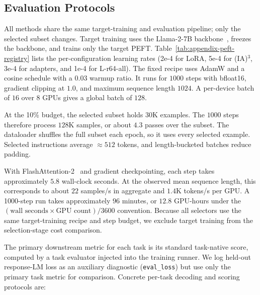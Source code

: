 \subsection{Evaluation Protocols}
\label{sec:appendix-protocols}

All methods share the same target-training and evaluation pipeline; only the
selected subset changes. Target training uses the Llama-2-7B
backbone~\cite{touvron2023llama2}, freezes the backbone, and trains only the
target PEFT. Table~\ref{tab:appendix-peft-registry} lists the per-configuration
learning rates (2e-4 for LoRA, 5e-4 for (IA)$^3$, 3e-4 for adapters, and 1e-4
for L-r64-all). The fixed recipe uses AdamW and a cosine schedule with a $0.03$
warmup ratio. It runs for $1000$ steps with
bfloat16, gradient clipping at $1.0$, and maximum sequence length $1024$. A
per-device batch of $16$ over $8$ GPUs gives a global batch of $128$.

At the 10\% budget, the selected subset holds $30$K examples. The $1000$ steps
therefore process $128$K samples, or about $4.3$ passes over the subset. The
dataloader shuffles the full subset each epoch, so it uses every selected example.
Selected instructions average $\approx512$ tokens, and length-bucketed batches
reduce padding.

With FlashAttention-2~\cite{dao2024flashattention2} and gradient checkpointing,
each step takes approximately $5.8$ wall-clock seconds. At the observed mean
sequence length, this corresponds to about $22$ samples/s in aggregate and
$1.4$K tokens/s per GPU. A 1000-step run takes approximately $96$ minutes, or
$12.8$ GPU-hours under the
$(\text{wall seconds}\times\text{GPU count})/3600$ convention. Because all
selectors use the same target-training recipe and step budget, we exclude
target training from the selection-stage cost comparison.

The primary downstream metric for each task is its standard task-native score,
computed by a task evaluator injected into the training runner. We log
held-out response-LM loss as an auxiliary diagnostic (\texttt{eval\_loss}) but use
only the primary task metric for comparison. Concrete per-task decoding and
scoring protocols are:


